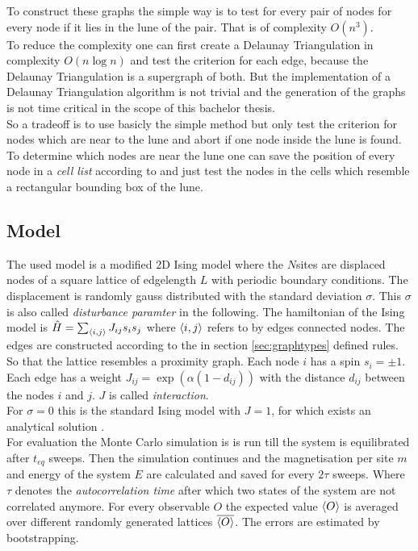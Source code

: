     To construct these graphs the simple way is to test for every
    pair of nodes for every node if it lies in the lune of the pair.
    That is of complexity \(O (n^3)\).\\
    To reduce the complexity one can first create a Delaunay
    Triangulation in complexity \(O (n \log n)\)
    \cite{Leach1992} and test the criterion for each edge, because
    the Delaunay Triangulation is a supergraph of both. But the
    implementation of a Delaunay Triangulation algorithm is not
    trivial and the generation of the graphs is not time critical in
    the scope of this bachelor thesis.\\
    So a tradeoff is to use basicly the simple method but only test
    the criterion for nodes which are near to the lune and abort if
    one node inside the lune is found. To determine which nodes are
    near the lune one can save the position of every node in a
    \emph{cell list} according to \cite{RNGCell} and just test the
    nodes in the cells which resemble a rectangular bounding box of the
    lune.

\subsection{Model}
    The used model is a modified 2D Ising model where the \(N\)sites are
    displaced nodes of a square lattice of edgelength \(L\) with
    periodic boundary conditions. The displacement is randomly gauss
    distributed with the standard deviation \(\sigma\). This \(\sigma\)
    is also called \emph{disturbance paramter} in the following.
    The hamiltonian of the Ising model is
    \(\hat{H} = \sum_{\left< i,j \right>}J_{ij}s_{i}s_{j}\)
    where \(\left< i,j \right>\) refers to by edges connected nodes.
    The edges are constructed according to the in section
    \ref{sec:graphtypes} defined rules. So that the lattice resembles a
    proximity graph. Each node \(i\) has a spin \(s_i = \pm 1\). Each
    edge has a weight \(J_{ij} = \exp (\alpha (1-d_{ij}))\) with the
    distance \(d_{ij}\) between the nodes \(i\) and \(j\). \(J\) is
    called \emph{interaction}.\\
    For \(\sigma = 0\) this is the standard Ising model with \(J = 1\),
    for which exists an analytical solution \cite{Onsager1944}.\\

    For evaluation the Monte Carlo simulation is is run till the system
    is equilibrated after \(t_{eq}\) sweeps. Then the simulation continues
    and the magnetisation per site \(m\) and energy of the system \(E\)
    are calculated and saved for every \(2\tau\) sweeps. Where \(\tau\)
    denotes the \emph{autocorrelation time} after which two states of
    the system are not correlated anymore.
    For every observable \(O\) the expected value \(\left< O \right>\) is averaged
    over different randomly generated lattices \(\overline{\left< O \right>}\). The
    errors are estimated by bootstrapping.

